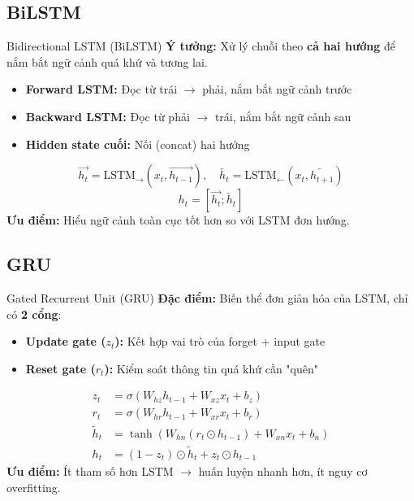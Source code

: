 \documentclass[serif, aspectratio=169]{beamer}
\begin{document}
\subsection{BiLSTM}
\begin{frame}{Bidirectional LSTM (BiLSTM)}
\textbf{Ý tưởng:} Xử lý chuỗi theo \textbf{cả hai hướng} để nắm bắt ngữ cảnh quá khứ và tương lai.

\vspace{0.3cm}
\begin{itemize}
    \item \textbf{Forward LSTM:} Đọc từ trái $\rightarrow$ phải, nắm bắt ngữ cảnh trước
    \item \textbf{Backward LSTM:} Đọc từ phải $\rightarrow$ trái, nắm bắt ngữ cảnh sau
    \item \textbf{Hidden state cuối:} Nối (concat) hai hướng
\end{itemize}
\vspace{0.3cm}
\[
\overrightarrow{h_t} = \text{LSTM}_{\rightarrow}(x_t, \overrightarrow{h_{t-1}}), \quad
\overleftarrow{h_t} = \text{LSTM}_{\leftarrow}(x_t, \overleftarrow{h_{t+1}})
\]
\[
h_t = [\overrightarrow{h_t} ; \overleftarrow{h_t}]
\]
\vspace{0.2cm}
\textbf{Ưu điểm:} Hiểu ngữ cảnh toàn cục tốt hơn so với LSTM đơn hướng.
\end{frame}

\subsection{GRU}
\begin{frame}{Gated Recurrent Unit (GRU)}
\textbf{Đặc điểm:} Biến thể đơn giản hóa của LSTM, chỉ có \textbf{2 cổng}:
\begin{itemize}
    \item \textbf{Update gate ($z_t$):} Kết hợp vai trò của forget + input gate
    \item \textbf{Reset gate ($r_t$):} Kiểm soát thông tin quá khứ cần "quên"
\end{itemize}
\vspace{0.3cm}
\begin{align*}
z_t &= \sigma(W_{hz} h_{t-1} + W_{xz} x_t + b_z) \\
r_t &= \sigma(W_{hr} h_{t-1} + W_{xr} x_t + b_r) \\
\tilde{h}_t &= \tanh(W_{hn}(r_t \odot h_{t-1}) + W_{xn} x_t + b_n) \\
h_t &= (1 - z_t) \odot \tilde{h}_t + z_t \odot h_{t-1}
\end{align*}
\vspace{0.2cm}
\textbf{Ưu điểm:} Ít tham số hơn LSTM $\rightarrow$ huấn luyện nhanh hơn, ít nguy cơ overfitting.
\end{frame}
\end{document}

